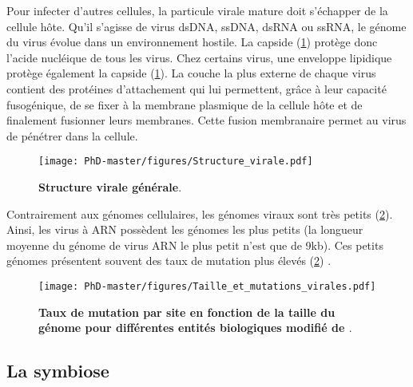 Pour infecter d'autres cellules, la particule virale mature doit s'échapper de la cellule hôte. Qu'il s'agisse de virus dsDNA, ssDNA, dsRNA ou ssRNA, le génome du virus évolue dans un environnement hostile. La capside (\figurename{\ref{figure:Structure_virale}}) protège donc l'acide nucléique de tous les virus. Chez certains virus, une enveloppe lipidique protège également la capside (\figurename{\ref{figure:Structure_virale}}). La couche la plus externe de chaque virus contient des protéines d'attachement qui lui permettent, grâce à leur capacité fusogénique, de se fixer à la membrane plasmique de la cellule hôte et de finalement fusionner leurs membranes. Cette fusion membranaire permet au virus de pénétrer dans la cellule. 


\begin{figure}[!htpb]
\captionsetup{font=footnotesize}
 \centering
  \texttt{[image: PhD-master/figures/Structure\_virale.pdf]}
\caption[Intro:Structure virale générale]{\textbf{Structure virale générale}.}
\label{figure:Structure_virale}
\end{figure}

Contrairement aux génomes cellulaires, les génomes viraux sont très petits (\figurename{\ref{figure:Taille_et_mutations_virales}}). Ainsi, les virus à ARN possèdent les génomes les plus petits (la longueur moyenne du génome de virus ARN le plus petit n'est que de 9kb). Ces petits génomes présentent souvent des taux de mutation plus élevés (\figurename{\ref{figure:Taille_et_mutations_virales}}) \citep{gago_extremely_2009}.

\begin{figure}[!htpb]
\captionsetup{font=footnotesize}
 \centering
  \texttt{[image: PhD-master/figures/Taille\_et\_mutations\_virales.pdf]}
\caption[Intro:Distribution des taux de mutation en fonction de la taille du génome]{\textbf{Taux de mutation par site en fonction de la taille du génome pour différentes entités biologiques modifié de \cite{gago_extremely_2009}}.}
\label{figure:Taille_et_mutations_virales}
\end{figure}


\subsection{La symbiose}


